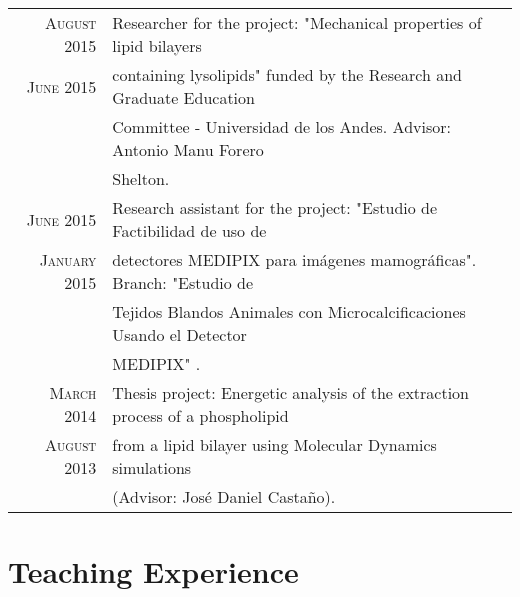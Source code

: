 \documentclass[a4paper,10pt]{article} %
\begin{document}
\begin{tabular}{rl}

\textsc{August 2015} & Researcher for the project: "Mechanical properties of lipid bilayers \\ 
\textsc{June 2015}   & containing lysolipids" funded by the Research and Graduate Education  \\ 
& Committee - Universidad de los Andes. Advisor: Antonio Manu Forero \\
& Shelton.  \\
\textsc{June 2015} & Research assistant for the project: "Estudio de Factibilidad de uso de \\ 
\textsc{January 2015} & detectores MEDIPIX para imágenes mamográficas". Branch: "Estudio de \\ 
& Tejidos Blandos Animales con Microcalciﬁcaciones Usando el Detector \\
& MEDIPIX" . \\

\textsc{March 2014} & Thesis project: Energetic analysis of the  extraction process of a phospholipid\\
\textsc{August 2013} & from a lipid bilayer using Molecular Dynamics simulations \\ & (Advisor: Jos\'e Daniel Casta\~no). 

\end{tabular}



\color{OrangeRed}
\section{Teaching Experience}
\color{black}
\end{document}
